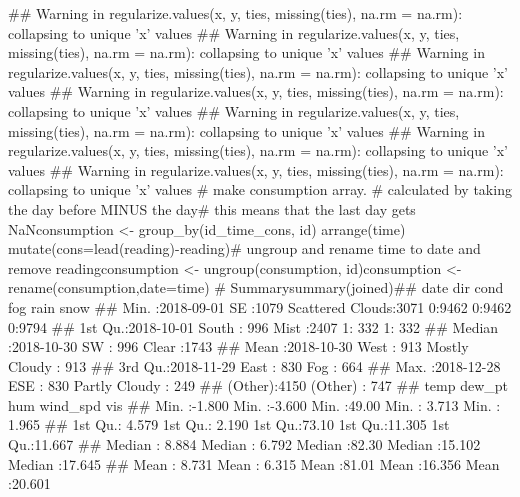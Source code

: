 \documentclass{article}\usepackage[]{graphicx}\usepackage[]{color}
\begin{document}
## Warning in regularize.values(x, y, ties, missing(ties), na.rm = na.rm): collapsing to unique 'x' values
## Warning in regularize.values(x, y, ties, missing(ties), na.rm = na.rm): collapsing to unique 'x' values
## Warning in regularize.values(x, y, ties, missing(ties), na.rm = na.rm): collapsing to unique 'x' values
## Warning in regularize.values(x, y, ties, missing(ties), na.rm = na.rm): collapsing to unique 'x' values
## Warning in regularize.values(x, y, ties, missing(ties), na.rm = na.rm): collapsing to unique 'x' values
## Warning in regularize.values(x, y, ties, missing(ties), na.rm = na.rm): collapsing to unique 'x' values
## Warning in regularize.values(x, y, ties, missing(ties), na.rm = na.rm): collapsing to unique 'x' values
# make consumption array. # calculated by taking the day before MINUS the day# this means that the last day gets NaNconsumption <- group_by(id_time_cons, id) %
  arrange(time) %
  mutate(cons=lead(reading)-reading)# ungroup and rename time to date and remove readingconsumption <- ungroup(consumption, id)consumption <- rename(consumption,date=time) %
# Summarysummary(joined)##       date                 dir                     cond      fog      rain     snow    
##  Min.   :2018-09-01   SE     :1079   Scattered Clouds:3071   0:9462   0:9462   0:9794  
##  1st Qu.:2018-10-01   South  : 996   Mist            :2407   1: 332   1: 332           
##  Median :2018-10-30   SW     : 996   Clear           :1743                             
##  Mean   :2018-10-30   West   : 913   Mostly Cloudy   : 913                             
##  3rd Qu.:2018-11-29   East   : 830   Fog             : 664                             
##  Max.   :2018-12-28   ESE    : 830   Partly Cloudy   : 249                             
##                       (Other):4150   (Other)         : 747                             
##       temp            dew_pt            hum           wind_spd           vis        
##  Min.   :-1.800   Min.   :-3.600   Min.   :49.00   Min.   : 3.713   Min.   : 1.965  
##  1st Qu.: 4.579   1st Qu.: 2.190   1st Qu.:73.10   1st Qu.:11.305   1st Qu.:11.667  
##  Median : 8.884   Median : 6.792   Median :82.30   Median :15.102   Median :17.645  
##  Mean   : 8.731   Mean   : 6.315   Mean   :81.01   Mean   :16.356   Mean   :20.601  
\end{document}
